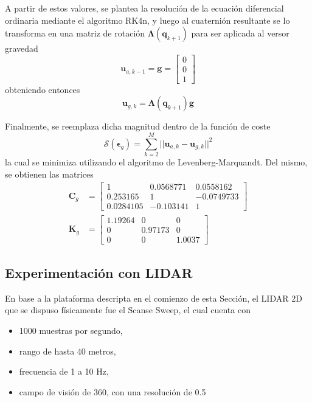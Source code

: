 A partir de estos valores, se plantea la resolución de la ecuación diferencial ordinaria mediante el algoritmo RK4n, y luego al cuaternión resultante se lo transforma en una matriz de rotación $\bm{\Lambda}(\bm{q}_{k+1})$ para ser aplicada al versor gravedad
\begin{equation}
    \bm{u}_{a,k-1} = \bm{g} =
    \begin{bmatrix}
        0 \\
        0 \\
        1
    \end{bmatrix}
\end{equation}
obteniendo entonces
\begin{equation}
    \bm{u}_{g,k} = \bm{\Lambda}(\bm{q}_{k+1})\bm{g}
\end{equation}

Finalmente, se reemplaza dicha magnitud dentro de la función de coste
\begin{equation}
    \mathscr{S}(\bm{\epsilon}_{g}) = \sum_{k=2}^M ||\bm{u}_{a,k} - \bm{u}_{g,k}||^2
\end{equation}
la cual se minimiza utilizando el algoritmo de Levenberg-Marquandt. Del mismo, se obtienen las matrices
\begin{align}
        \bm{C}_g &=
    \begin{bmatrix}
        1 & 0.0568771 & 0.0558162 \\
        0.253165 & 1 & -0.0749733 \\
        0.0284105 & -0.103141 & 1
    \end{bmatrix}
    \\
        \bm{K}_g &=
    \begin{bmatrix}
        1.19264 & 0 & 0 \\
        0 & 0.97173 & 0 \\
        0 & 0 & 1.0037
    \end{bmatrix}
\end{align}
\subsection{Experimentación con LIDAR}
En base a la plataforma descripta en el comienzo de esta Sección, el LIDAR 2D que se dispuso físicamente fue el Scanse Sweep, el cual cuenta con 
\begin{itemize}
    \item 1000 muestras por segundo,
    \item rango de hasta 40 metros,
    \item frecuencia de 1 a 10 Hz,
    \item campo de visión de 360\textdegree, con una resolución de 0.5\textdegree
\end{itemize}

